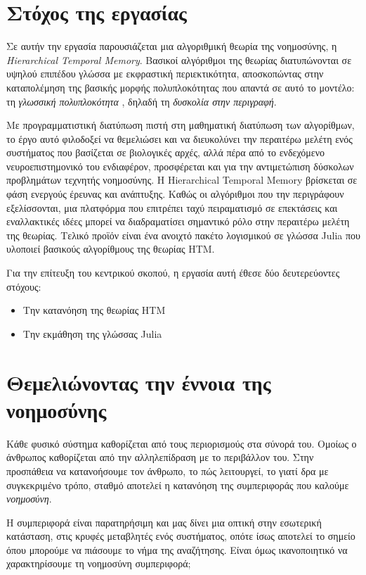 \section{Στόχος της εργασίας}

  Σε αυτήν την εργασία παρουσιάζεται μια αλγοριθμική θεωρία της νοημοσύνης, η \textit{Hierarchical Temporal Memory}.
  Βασικοί αλγόριθμοι της θεωρίας διατυπώνονται σε υψηλού επιπέδου γλώσσα με εκφραστική περιεκτικότητα,
  αποσκοπώντας στην καταπολέμηση της βασικής μορφής πολυπλοκότητας που απαντά σε αυτό το μοντέλο:
  τη \textit{γλωσσική πολυπλοκότητα} \parencite{chazelleNaturalAlgorithmsInfluence}, δηλαδή τη \textit{δυσκολία στην περιγραφή}.

  Με προγραμματιστική διατύπωση πιστή στη μαθηματική διατύπωση των αλγορίθμων, το έργο αυτό φιλοδοξεί να θεμελιώσει και να
  διευκολύνει την περαιτέρω μελέτη ενός συστήματος που βασίζεται σε βιολογικές αρχές,
  αλλά πέρα από το ενδεχόμενο νευροεπιστημονικό του ενδιαφέρον,
  προσφέρεται και για την αντιμετώπιση δύσκολων προβλημάτων τεχνητής νοημοσύνης.
  Η Hierarchical Temporal Memory βρίσκεται σε φάση ενεργούς έρευνας και ανάπτυξης.
  Καθώς οι αλγόριθμοι που την περιγράφουν εξελίσσονται, μια πλατφόρμα που επιτρέπει ταχύ πειραματισμό σε επεκτάσεις και εναλλακτικές ιδέες
  μπορεί να διαδραματίσει σημαντικό ρόλο στην περαιτέρω μελέτη της θεωρίας.
  Τελικό προϊόν είναι ένα ανοιχτό πακέτο λογισμικού σε γλώσσα Julia που υλοποιεί βασικούς αλγορίθμους της θεωρίας HTM.

  Για την επίτευξη του κεντρικού σκοπού, η εργασία αυτή έθεσε δύο δευτερεύοντες στόχους:
  \begin{itemize}
    \item Την κατανόηση της θεωρίας HTM
    \item Την εκμάθηση της γλώσσας Julia
  \end{itemize}


\section{Θεμελιώνοντας την έννοια της νοημοσύνης}

  Κάθε φυσικό σύστημα καθορίζεται από τους περιορισμούς στα σύνορά του.
  Ομοίως ο άνθρωπος καθορίζεται από την αλληλεπίδραση με το περιβάλλον του.
  Στην προσπάθεια να κατανοήσουμε τον άνθρωπο, το πώς λειτουργεί, το γιατί δρα με συγκεκριμένο τρόπο,
  σταθμό αποτελεί η κατανόηση της συμπεριφοράς που καλούμε \textit{νοημοσύνη}.

  Η συμπεριφορά είναι παρατηρήσιμη και μας δίνει μια οπτική στην εσωτερική κατάσταση, στις κρυφές μεταβλητές ενός συστήματος,
  οπότε ίσως αποτελεί το σημείο όπου μπορούμε να πιάσουμε το νήμα της αναζήτησης.
  Είναι όμως ικανοποιητικό να χαρακτηρίσουμε τη νοημοσύνη συμπεριφορά;

